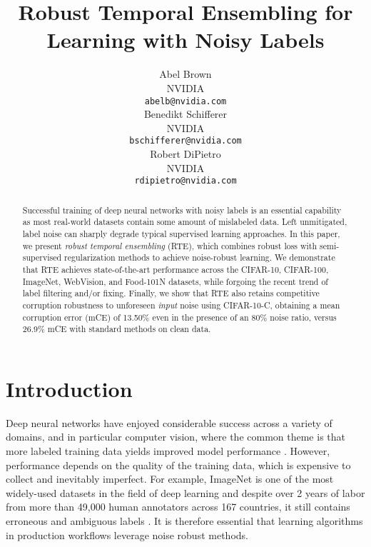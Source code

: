 \documentclass{article}
\title{Robust Temporal Ensembling for Learning with Noisy Labels}
\author{Abel Brown \\
  NVIDIA \\
  \texttt{abelb@nvidia.com} \\
  \And
  Benedikt Schifferer \\
  NVIDIA \\
  \texttt{bschifferer@nvidia.com} \\
  \And
  Robert DiPietro \\
  NVIDIA \\
  \texttt{rdipietro@nvidia.com} \\
}
\begin{document}
\maketitle

\begin{abstract}
Successful training of deep neural networks with noisy labels is an essential capability as most real-world datasets contain some amount of mislabeled data.  Left unmitigated, label noise can sharply degrade typical supervised learning approaches.  In this paper, we present \emph{robust temporal ensembling} (RTE), which combines robust loss with semi-supervised regularization methods to achieve noise-robust learning.  We demonstrate that RTE achieves state-of-the-art performance across the CIFAR-10, CIFAR-100, ImageNet, WebVision, and Food-101N datasets, while forgoing the recent trend of label filtering and/or fixing. Finally, we show that RTE also retains competitive corruption robustness to unforeseen \emph{input} noise using CIFAR-10-C, obtaining a mean corruption error (mCE) of 13.50\% even in the presence of an 80\% noise ratio, versus 26.9\% mCE with standard methods on clean data.
\end{abstract}


\section{Introduction}

Deep neural networks have enjoyed considerable success across a variety of domains, and in particular computer vision, where the common theme is that more labeled training data yields improved model performance \cite{2017arXiv171200409H, 2018arXiv180500932M, 2019arXiv191104252X, 2019arXiv191211370K}.  However, performance depends on the quality of the training data, which is expensive to collect and inevitably imperfect. For example, ImageNet \cite{deng2009} is one of the most widely-used datasets in the field of deep learning and despite over 2 years of labor from more than 49,000 human annotators across 167 countries, it still contains erroneous and ambiguous labels \cite{li2017, karpathy2014}. It is therefore essential that learning algorithms in production workflows leverage noise robust methods.
\end{document}
